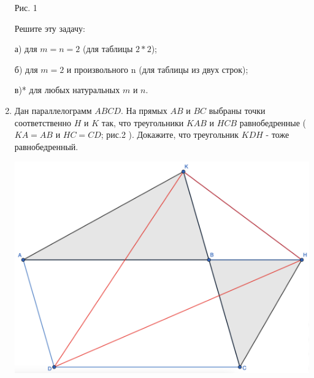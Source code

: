 \begin{enumerate}[font=\bfseries, wide,  labelindent=0pt, noitemsep]
Рис. 1
\newline

Решите эту задачу: \par
	а) для $m = n = 2$ (для таблицы $2*2$); \par
	б) для $m = 2$ и произвольного n (для таблицы из двух строк); \par
	в)* для любых натуральных $m$ и $n$. \par


    \item Дан параллелограмм $ABCD$. На прямых $AB$ и $BC$ выбраны точки соответственно $H$ и $K$ так, что треугольники $KAB$ и $HCB$ равнобедренные ($KA = AB$ и $HC = CD$; рис.2 ). Докажите, что треугольник $KDH$ - тоже равнобедренный. \par
    \includegraphics[width=\linewidth]{polygon.png}


\end{enumerate}

